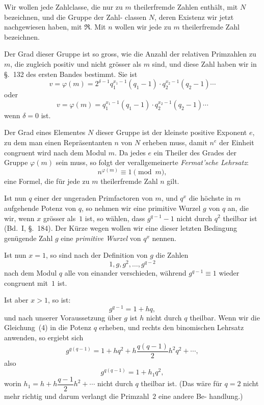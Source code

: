 \documentclass[12pt,a4paper]{article}
\theoremstyle{plain}
\theoremstyle{definition}
\theoremstyle{remark}
\begin{document}
Wir wollen jede Zahlclasse, die nur zu $m$ theilerfremde
Zahlen enthält, mit $N$ bezeichnen, und die Gruppe der Zahl-
classen $N$, deren Existenz wir jetzt nachgewiesen haben, mit $\mathfrak{R}$.
Mit $n$ wollen wir jede zu $m$ theilerfremde Zahl bezeichnen.

Der Grad dieser Gruppe ist so gross, wie die Anzahl der
relativen Primzahlen zu $m$, die zugleich positiv und nicht grösser
als $m$ sind, und diese Zahl haben wir in \S.~132 des ersten Bandes
bestimmt. Sie ist
\begin{equation}\tag{2}
v = \varphi(m) = 2^{\delta-1} q_1^{x_1-1}(q_1-1) \cdot q_2^{x_2-1}(q_2-1) \cdots
\end{equation}
oder
\[
v = \varphi(m) = q_1^{x_1-1}(q_1-1) \cdot q_2^{x_2-1}(q_2-1) \cdots
\]
wenn $\delta = 0$ ist.

Der Grad eines Elementes $N$ dieser Gruppe ist der kleinste
positive Exponent $e$, zu dem man einen Repräsentanten $n$ von $N$
erheben muss, damit $n^e$ der Einheit congruent wird nach dem
Modul $m$. Da jedes $e$ ein Theiler des Grades der Gruppe $\varphi(m)$
sein muss, so folgt der verallgemeinerte \emph{Fermat'sche
Lehrsatz}:
\begin{equation}\tag{3}
n^{\varphi(m)} \equiv 1 \pmod{m},
\end{equation}
eine Formel, die für jede zu $m$ theilerfremde Zahl $n$ gilt.

Ist nun $q$ einer der ungeraden Primfactoren von $m$, und $q^x$
die höchste in $m$ aufgehende Potenz von $q$, so nehmen wir eine
primitive Wurzel $g$ von $q$ an, die wir, wenn $x$ grösser als~$1$
ist, so wählen, dass $g^{q-1} - 1$ nicht durch $q^2$ theilbar ist (Bd.~I,
\S.~184). Der Kürze wegen wollen wir eine dieser letzten
Bedingung genügende Zahl $g$ eine \emph{primitive Wurzel} von $q^x$
nennen.

Ist nun $x = 1$, so sind nach der Definition von $g$ die Zahlen
\[
1, g, g^2, \ldots, g^{q-2}
\]
nach dem Modul $q$ alle von einander verschieden, während $g^{q-1} \equiv 1$
wieder congruent mit~$1$ ist.

Ist aber $x > 1$, so ist:
\begin{equation}\tag{4}
g^{q-1} = 1 + hq,
\end{equation}
und nach unserer Voraussetzung über $g$ ist $h$ nicht durch $q$
theilbar. Wenn wir die Gleichung~(4) in die Potenz $q$ erheben,
und rechts den binomischen Lehrsatz anwenden, so ergiebt sich
\[
g^{q(q-1)} = 1 + hq^2 + h \frac{q(q-1)}{2} h^2 q^2 + \cdots,
\]
also
\begin{equation}\tag{5}
g^{q(q-1)} = 1 + h_1 q^2,
\end{equation}
worin $h_1 = h + h \dfrac{q-1}{2} h^2 + \cdots$
nicht durch $q$ theilbar ist. (Das wäre für $q = 2$ nicht mehr
richtig und darum verlangt die Primzahl~$2$ eine andere Be-
handlung.)
\end{document}
